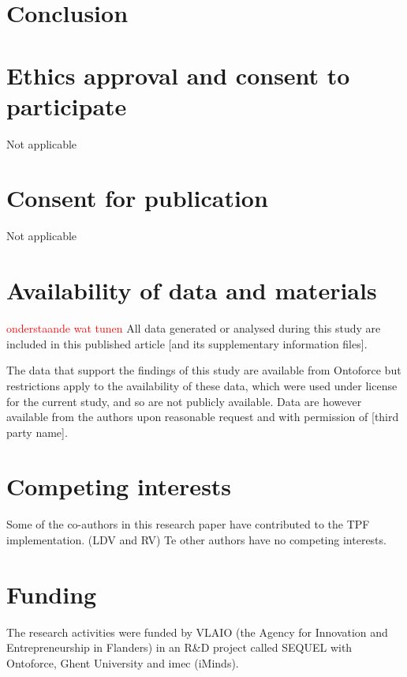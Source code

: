 \documentclass[twocolumn]{bmcart}%
\newcommand\todo[1]{\textcolor{red}{#1}}
\begin{document}
\section{Conclusion}



\begin{backmatter}

\section*{Ethics approval and consent to participate}
Not applicable

\section*{Consent for publication}
Not applicable

\section*{Availability of data and materials}

\todo{onderstaande wat tunen}
All data generated or analysed during this study are included in this published article [and its supplementary information files].

The data that support the findings of this study are available from Ontoforce but restrictions apply to the availability of these data, which were used under license for the current study, and so are not publicly available. Data are however available from the authors upon reasonable request and with permission of [third party name].

\section*{Competing interests}
Some of the co-authors in this research paper have contributed to the TPF implementation. (LDV and RV) Te other authors have no competing interests.

\section*{Funding}
The research activities were funded by VLAIO (the Agency for Innovation and
Entrepreneurship in Flanders) in an R\&D project called SEQUEL with Ontoforce, Ghent University and imec (iMinds). 


\end{backmatter}
\end{document}
